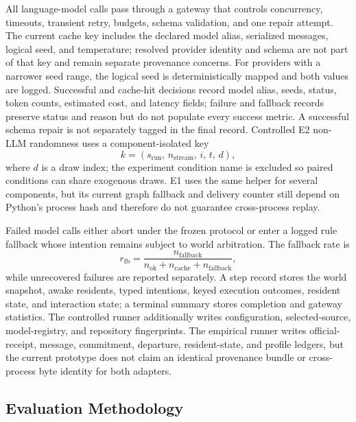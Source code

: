 \documentclass[journal]{IEEEtran}
\begin{document}
All language-model calls pass through a gateway that controls concurrency,
timeouts, transient retry, budgets, schema validation, and one repair attempt.
The current cache key includes the declared model alias, serialized messages,
logical seed, and temperature; resolved provider identity and schema are not
part of that key and remain separate provenance concerns.
For providers with a narrower seed range, the logical seed is deterministically
mapped and both values are logged. Successful and cache-hit decisions record
model alias, seeds, status, token counts, estimated cost, and latency fields;
failure and fallback records preserve status and reason but do not populate
every success metric. A successful schema repair is not separately tagged in
the final record. Controlled E2 non-LLM randomness uses a component-isolated key
\begin{equation}
  k=(s_{\mathrm{run}},\,n_{\mathrm{stream}},\,i,\,t,\,d),
\end{equation}
where $d$ is a draw index; the experiment condition name is excluded so paired
conditions can share exogenous draws. E1 uses the same helper for several
components, but its current graph fallback and delivery counter still depend on
Python's process hash and therefore do not guarantee cross-process replay.

Failed model calls either abort under the frozen protocol or enter a logged
rule fallback whose intention remains subject to world arbitration. The
fallback rate is
\begin{equation}
  r_{\mathrm{fb}}=
  \frac{n_{\mathrm{fallback}}}
  {n_{\mathrm{ok}}+n_{\mathrm{cache}}+n_{\mathrm{fallback}}},
  \label{eq:fallback}
\end{equation}
while unrecovered failures are reported separately. A step record stores the
world snapshot, awake residents, typed intentions, keyed execution outcomes,
resident state, and interaction state; a terminal summary stores completion and
gateway statistics. The controlled runner additionally writes configuration,
selected-source, model-registry, and repository fingerprints. The empirical runner writes
official-receipt, message, commitment, departure, resident-state, and profile
ledgers, but the current prototype does not claim an identical provenance
bundle or cross-process byte identity for both adapters.

\subsection{Evaluation Methodology}
\label{sec:evaluation-method}
\end{document}
